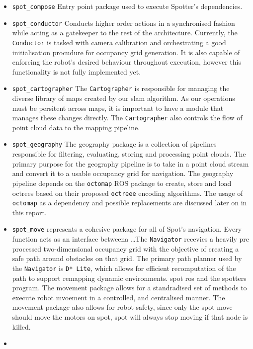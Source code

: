 \documentclass[10pt,english]{article}
\begin{document}
\begin{itemize}[noitemsep]
    \item \texttt{spot\_compose} Entry point package used to execute Spotter's dependencies.
    \item \texttt{spot\_conductor} Conducts higher order actions in a synchronised fashion while acting as a gatekeeper to the rest of the architecture. Currently, the \texttt{Conductor} is tasked with camera calibration and orchestrating a good initialisation procudure for occupancy grid generation. It is also capable of enforcing the robot's desired behaviour throughout execution, however this functionality is not fully implemented yet.
    \item \texttt{spot\_cartographer} The \texttt{Cartographer} is responsible for managing the diverse library of maps created by our slam algorithm. As our operations must be persitent across maps, it is important to have a module that manages these changes directly. The \texttt{Cartographer} also controls the flow of point cloud data to the mapping pipeline.
    \item \texttt{spot\_geography} The geography package is a collection of pipelines responsible
    for filtering, evaluating, storing and processing point clouds. The primary purpose for the geography pipeline is to take in a point cloud stream and convert it to a usable occupancy grid for navigation. The geography pipeline depends on the \texttt{octomap} ROS package to create, store and load octrees based on their proposed \texttt{octreee} encoding algorithms. The usage of \texttt{octomap} as a dependency and possible replacements are discussed later on in this report.
    \item \texttt{spot\_move} represents a cohesive package for all of Spot's navigation. Every function acts as an interface betweena \dots The \texttt{Navigator} recevies a heavily pre processed two-dimensional occupancy grid with the objective of creating a safe path around obstacles on that grid. The primary path planner used by the \texttt{Navigator} is \texttt{D* Lite}, which allows for efficient recomputation of the path to support remapping dynamic environments.
 spot ros and the spotters program. The movement package allows for a standradised set of methods to execute robot mvoement in a controlled, and centralised manner. The movement package also allows for robot safety, since only the spot move should move the motors on spot, spot will always stop moving if that node is killed.
    \item {}\end{itemize}
\end{document}
